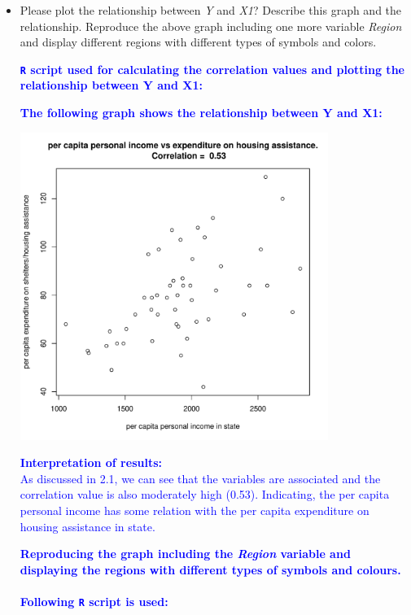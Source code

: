 \documentclass[12pt,letterpaper]{article}
\begin{document}
\begin{itemize}
\pagebreak

\item
Please plot the relationship between \emph{Y} and \emph{X1}? Describe this graph and the relationship. Reproduce the above graph including one more variable \emph{Region} and display different regions with different types of symbols and colors.

\textcolor{blue}{
	\noindent \textbf{\texttt{R} script used for calculating the correlation values and plotting the relationship between Y and X1:}
}

  

\vspace{.25cm}

\textcolor{blue}{
	\noindent \textbf{The following graph shows the relationship between Y and X1:}
}
\begin{center}
	\includegraphics[width=10cm]{plot_Y_X1.pdf}  
\end{center}

\textcolor{blue}{
	\textbf{Interpretation of results:}\\
	As discussed in 2.1, we can see that the variables are associated and the correlation value is also moderately high (0.53). Indicating, the per capita personal income has some relation with the per capita expenditure on housing assistance in state.
}
\pagebreak

\textcolor{blue}{
	\textbf{Reproducing the graph including the \textit{Region} variable and displaying the regions with different types of symbols and colours.\\}
	\noindent \textbf{\\Following \texttt{R} script is used:}
}


\end{itemize}
\end{document}
